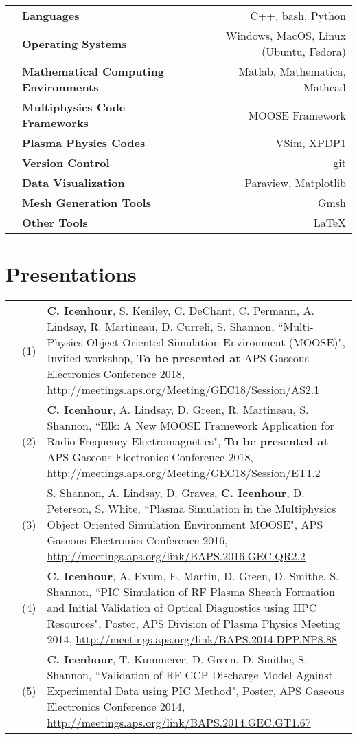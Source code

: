 \documentclass{article}
\begin{document}
	\begin{tabularx}{\textwidth}{l X r}
		\hspace {2em} & \textbf{Languages} & C++, bash, Python \\
					  & \textbf{Operating Systems} & Windows, MacOS, Linux (Ubuntu, Fedora) \\
					  & \textbf{Mathematical Computing Environments} & Matlab, Mathematica, Mathcad \\
					  & \textbf{Multiphysics Code Frameworks} & MOOSE Framework \\
					  & \textbf{Plasma Physics Codes} & VSim, XPDP1 \\
					  & \textbf{Version Control} & git \\
					  & \textbf{Data Visualization} & Paraview, Matplotlib \\
					  & \textbf{Mesh Generation Tools} & Gmsh \\
					  & \textbf{Other Tools} & \LaTeX
	\end{tabularx}

\section*{Presentations}

	\begin{tabularx}{\textwidth}{l l X}
		\hspace{2em} & (1)  & \textbf{C. Icenhour}, S. Keniley, C. DeChant, C. Permann, A. Lindsay, R. Martineau, D. Curreli, S. Shannon, ``Multi-Physics Object Oriented Simulation Environment (MOOSE)", Invited workshop, \textbf{To be presented at} APS Gaseous Electronics Conference 2018, \url{http://meetings.aps.org/Meeting/GEC18/Session/AS2.1} \\
			& (2)  & \textbf{C. Icenhour}, A. Lindsay, D. Green, R. Martineau, S. Shannon, ``Elk: A New MOOSE Framework Application for Radio-Frequency Electromagnetics", \textbf{To be presented at} APS Gaseous Electronics Conference 2018, \url{http://meetings.aps.org/Meeting/GEC18/Session/ET1.2} \\
			& (3)  &  S. Shannon, A. Lindsay, D. Graves, \textbf{C. Icenhour}, D. Peterson, S. White, ``Plasma Simulation in the Multiphysics Object Oriented Simulation Environment MOOSE", APS Gaseous Electronics Conference 2016, \newline \url{http://meetings.aps.org/link/BAPS.2016.GEC.QR2.2} \\
			& (4)  & \textbf{C. Icenhour}, A. Exum, E. Martin, D. Green, D. Smithe, S. Shannon, ``PIC Simulation of RF Plasma Sheath Formation and Initial Validation of Optical Diagnostics using HPC Resources", Poster, APS Division of Plasma Physics Meeting 2014, \url{http://meetings.aps.org/link/BAPS.2014.DPP.NP8.88} \\
			& (5)  & \textbf{C. Icenhour}, T. Kummerer, D. Green, D. Smithe, S. Shannon, ``Validation of RF CCP Discharge Model Against Experimental Data using PIC Method", Poster, APS Gaseous Electronics Conference 2014, \newline \url{http://meetings.aps.org/link/BAPS.2014.GEC.GT1.67}
	\end{tabularx}
\end{document}
